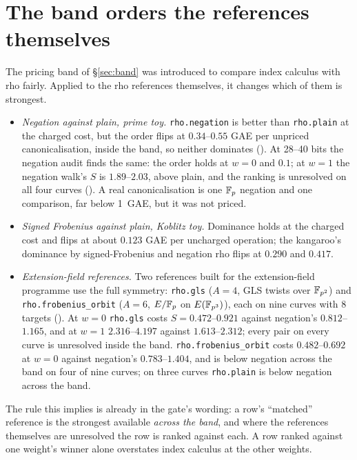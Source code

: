 \section{The band orders the references themselves}\label{sec:mr-band}

The pricing band of \S\ref{sec:band} was introduced to compare index
calculus with rho fairly. Applied to the rho references themselves, it
changes which of them is strongest.
\begin{itemize}
\item \emph{Negation against plain, prime toy.} \texttt{rho.negation} is
  better than \texttt{rho.plain} at the charged cost, but the order flips
  at $0.34$--$0.55$ GAE per unpriced canonicalisation, inside the band, so
  neither dominates (). At 28--40 bits the
  negation audit finds the same: the order holds at $w=0$ and $0.1$; at
  $w=1$ the negation walk's $S$ is $1.89$--$2.03$, above plain, and the
  ranking is unresolved on all four curves
  (). A real
  canonicalisation is one $\mathbb{F}_p$ negation and one comparison, far below
  1~GAE, but it was not priced.
\item \emph{Signed Frobenius against plain, Koblitz toy.} Dominance holds at
  the charged cost and flips at about $0.123$ GAE per uncharged operation;
  the kangaroo's dominance by signed-Frobenius and negation rho flips at
  $0.290$ and $0.417$.
\item \emph{Extension-field references.} Two references built for the
  extension-field programme use the full symmetry: \texttt{rho.gls}
  ($A=4$, GLS twists over $\mathbb{F}_{p^2}$) and \texttt{rho.frobenius\_orbit}
  ($A=6$, $E/\mathbb{F}_p$ on $E(\mathbb{F}_{p^3})$), each on nine curves with 8 targets
  (). At $w=0$ \texttt{rho.gls}
  costs $S=0.472$--$0.921$ against negation's $0.812$--$1.165$, and at $w=1$
  $2.316$--$4.197$ against $1.613$--$2.312$; every pair on every curve is
  unresolved inside the band. \texttt{rho.frobenius\_orbit} costs
  $0.482$--$0.692$ at $w=0$ against negation's $0.783$--$1.404$, and is below
  negation across the band on four of nine curves; on three curves
  \texttt{rho.plain} is below negation across the band.
\end{itemize}
The rule this implies is already in the gate's wording: a row's ``matched''
reference is the strongest available \emph{across the band}, and where the
references themselves are unresolved the row is ranked against each. A row
ranked against one weight's winner alone overstates index calculus at the
other weights.

